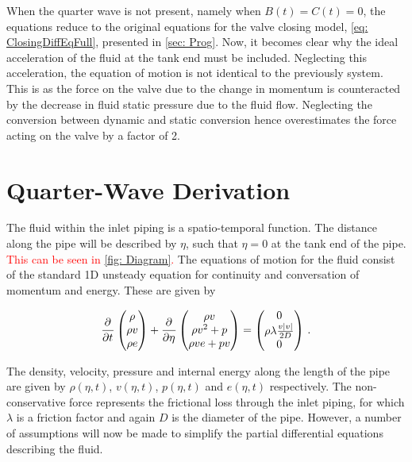 When the quarter wave is not present, namely when $B(t) = C(t) = 0$, the equations reduce to the original equations for the valve closing model, \cref{eq: ClosingDiffEqFull}, presented in \cref{sec: Prog}. Now, it becomes clear why the ideal acceleration of the fluid at the tank end must be included. Neglecting this acceleration, the equation of motion is not identical to the previously system. This is as the force on the valve due to the change in momentum is counteracted by the decrease in fluid static pressure due to the fluid flow. Neglecting the conversion between dynamic and static conversion hence overestimates the force acting on the valve by a factor of 2.

\section{Quarter-Wave Derivation} \label{subsec: QWM Derivation}

The fluid within the inlet piping is a spatio-temporal function. The distance along the pipe will be described by $\eta$, such that $\eta = 0$ at the tank end of the pipe. \textcolor{Red}{This can be seen in \cref{fig: Diagram}.} The equations of motion for the fluid consist of the standard 1D unsteady equation for continuity and conversation of momentum and energy. These are given by

\begin{equation*}
    \pdiff{}{t} \begin{pmatrix}
    \rho \\ \rho v \\ \rho e
    \end{pmatrix} +
    \pdiff{}{\eta} \begin{pmatrix}
    \rho v \\ \rho v^2 + p \\ \rho v e + p v
    \end{pmatrix} =
    \begin{pmatrix}
    0 \\ \rho \lambda \frac{v \left| v \right|}{2 D} \\ 0
    \end{pmatrix} \, .
\end{equation*}

The density, velocity, pressure and internal energy along the length of the pipe are given by $\rho(\eta,t)$, $v(\eta,t)$, $p(\eta,t)$ and $e(\eta,t)$ respectively. The non-conservative force represents the frictional loss through the inlet piping, for which $\lambda$ is a friction factor and again $D$ is the diameter of the pipe. However, a number of assumptions will now be made to simplify the partial differential equations describing the fluid.

